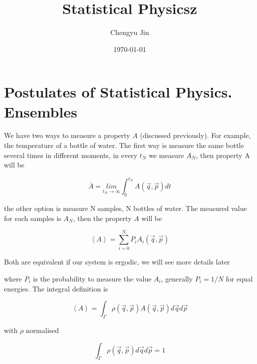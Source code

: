 \documentclass[12pt,a4paper]{report}
\title{Statistical Physicsz}
\author{Chengyu Jin}
\date{\today}
\newcommand{\esp}{\vspace{0.5cm}}
\newcommand{\prom}[1]{\left\langle #1 \right\rangle}
\begin{document}
	
	\maketitle
	
	\tableofcontents
	\newpage
	
	\chapter{Postulates of Statistical Physics. Ensembles}
	
	We have two ways to measure a property $A$ (discussed previously). For example, the temperature of a bottle of water. The first way is measure the same bottle several times in different moments, in every $t_N$ we measure $A_N$, then property A will be
	
	\esp
	
	\begin{equation}
		\bar{A} = \underset{t_N \rightarrow \infty}{lim} \int_0^{t_N} A(\vec{q},\vec{p}) dt
	\end{equation}
	
	\esp
	
	the other option is measure N samples, N bottles of water. The measured value for each samples is $A_N$, then the property $A$ will be
	
	\esp
	
	\begin{equation}
		\prom{A} = \sum_{i=0}^N P_i A_i(\vec{q},\vec{p})
	\end{equation}
	
	\esp
	
	\begin{nota}
		Both are equivalent if our system is ergodic, we will see more details later
	\end{nota}
	
	\esp
	
	\noindent where $P_i$ is the probability to measure the value $A_i$, generally $P_i = 1/N$ for equal energies. The integral definition is 
	
	\esp
	
	\begin{equation}
		\prom{A} = \int_\Gamma \rho(\vec{q},\vec{p})A(\vec{q},\vec{p})d\vec{q}d\vec{p}
	\end{equation}
	
	\esp
	
	\noindent with $\rho$ normalised 
	
	\esp
	
	\begin{equation}
		\int_\Gamma \rho(\vec{q},\vec{p})d\vec{q}d\vec{p} = 1
	\end{equation}
	
\end{document}
